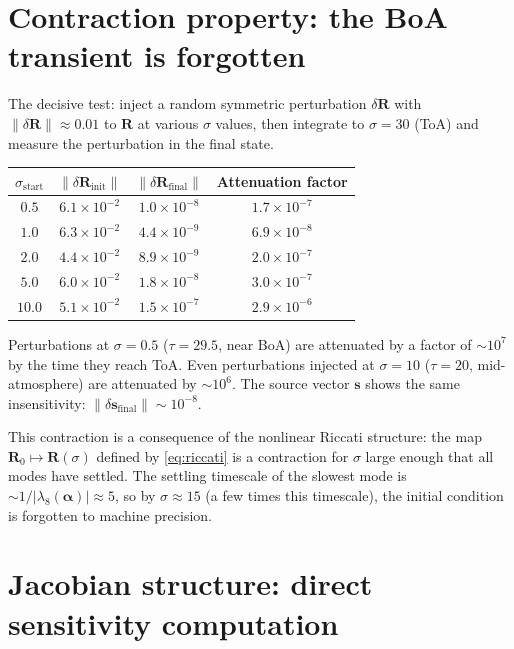 \documentclass[11pt]{article}
\newcommand{\bR}{\mathbf{R}}
\newcommand{\bs}{\mathbf{s}}
\newcommand{\balpha}{\boldsymbol{\alpha}}
\newcommand{\norm}[1]{\lVert #1 \rVert}
\begin{document}
\section{Contraction property: the BoA transient is forgotten}

The decisive test: inject a random symmetric perturbation
$\delta\bR$ with $\norm{\delta\bR}\approx 0.01$ to $\bR$
at various $\sigma$ values, then integrate to $\sigma=30$ (ToA)
and measure the perturbation in the final state.

\begin{center}
\begin{tabular}{c c c c}
\toprule
$\sigma_\mathrm{start}$ & $\norm{\delta\bR_\mathrm{init}}$
  & $\norm{\delta\bR_\mathrm{final}}$ & Attenuation factor\\
\midrule
$0.5$  & $6.1\times10^{-2}$ & $1.0\times10^{-8}$ & $1.7\times10^{-7}$\\
$1.0$  & $6.3\times10^{-2}$ & $4.4\times10^{-9}$ & $6.9\times10^{-8}$\\
$2.0$  & $4.4\times10^{-2}$ & $8.9\times10^{-9}$ & $2.0\times10^{-7}$\\
$5.0$  & $6.0\times10^{-2}$ & $1.8\times10^{-8}$ & $3.0\times10^{-7}$\\
$10.0$ & $5.1\times10^{-2}$ & $1.5\times10^{-7}$ & $2.9\times10^{-6}$\\
\bottomrule
\end{tabular}
\end{center}

Perturbations at $\sigma=0.5$ ($\tau=29.5$, near BoA) are
attenuated by a factor of ${\sim}10^7$ by the time they
reach ToA.  Even perturbations injected at $\sigma=10$
($\tau=20$, mid-atmosphere) are attenuated by ${\sim}10^6$.
The source vector $\bs$ shows the same insensitivity:
$\norm{\delta\bs_\mathrm{final}}\sim10^{-8}$.

This contraction is a consequence of the nonlinear Riccati
structure: the map $\bR_0 \mapsto \bR(\sigma)$ defined by
\eqref{eq:riccati} is a contraction for $\sigma$ large enough
that all modes have settled.  The settling timescale of the
slowest mode is ${\sim}1/|\lambda_8(\balpha)| \approx 5$,
so by $\sigma\approx 15$ (a few times this timescale), the
initial condition is forgotten to machine precision.


\section{Jacobian structure: direct sensitivity computation}
\label{sec:jacobian}
\end{document}
